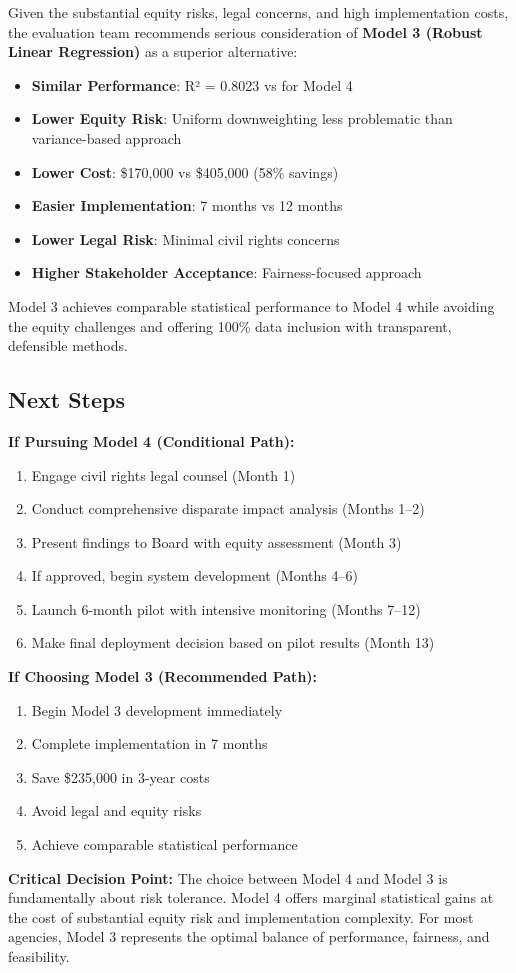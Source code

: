 Given the substantial equity risks, legal concerns, and high implementation costs, the evaluation team recommends serious consideration of \textbf{Model 3 (Robust Linear Regression)} as a superior alternative:

\begin{itemize}
    \item \textbf{Similar Performance}: R² = 0.8023 vs \ModelFourRSquaredTest{} for Model 4
    \item \textbf{Lower Equity Risk}: Uniform downweighting less problematic than variance-based approach
    \item \textbf{Lower Cost}: \$170,000 vs \$405,000 (58\% savings)
    \item \textbf{Easier Implementation}: 7 months vs 12 months
    \item \textbf{Lower Legal Risk}: Minimal civil rights concerns
    \item \textbf{Higher Stakeholder Acceptance}: Fairness-focused approach
\end{itemize}

Model 3 achieves comparable statistical performance to Model 4 while avoiding the equity challenges and offering 100\% data inclusion with transparent, defensible methods.

\subsection{Next Steps}

\textbf{If Pursuing Model 4 (Conditional Path):}
\begin{enumerate}
    \item Engage civil rights legal counsel (Month 1)
    \item Conduct comprehensive disparate impact analysis (Months 1--2)
    \item Present findings to Board with equity assessment (Month 3)
    \item If approved, begin system development (Months 4--6)
    \item Launch 6-month pilot with intensive monitoring (Months 7--12)
    \item Make final deployment decision based on pilot results (Month 13)
\end{enumerate}

\textbf{If Choosing Model 3 (Recommended Path):}
\begin{enumerate}
    \item Begin Model 3 development immediately
    \item Complete implementation in 7 months
    \item Save \$235,000 in 3-year costs
    \item Avoid legal and equity risks
    \item Achieve comparable statistical performance
\end{enumerate}

\textbf{Critical Decision Point:} The choice between Model 4 and Model 3 is fundamentally about risk tolerance. Model 4 offers marginal statistical gains at the cost of substantial equity risk and implementation complexity. For most agencies, Model 3 represents the optimal balance of performance, fairness, and feasibility.